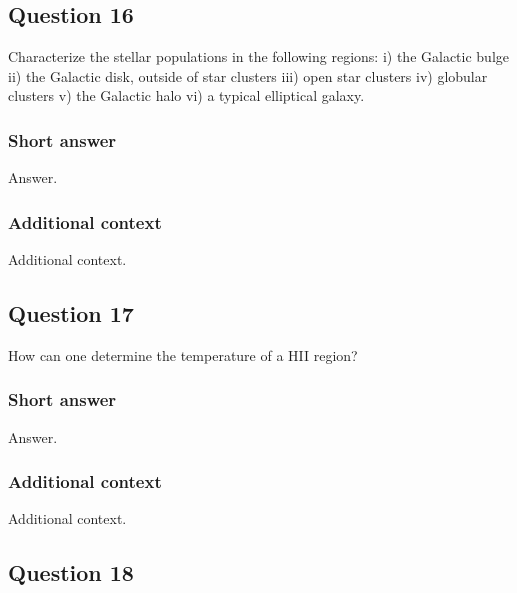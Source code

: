 \documentclass[a4paper,10pt]{article}
\begin{document}

\newpage
\subsection{Question 16}

Characterize the stellar populations in the following regions: i) the Galactic bulge ii) the Galactic disk, outside of star clusters iii) open star clusters iv) globular clusters v) the Galactic halo vi) a typical elliptical galaxy.

\subsubsection{Short answer}

Answer.

\subsubsection{Additional context}

Additional context.


\newpage
\subsection{Question 17}

How can one determine the temperature of a HII region?

\subsubsection{Short answer}

Answer.

\subsubsection{Additional context}

Additional context.


\newpage
\subsection{Question 18}
\end{document}
